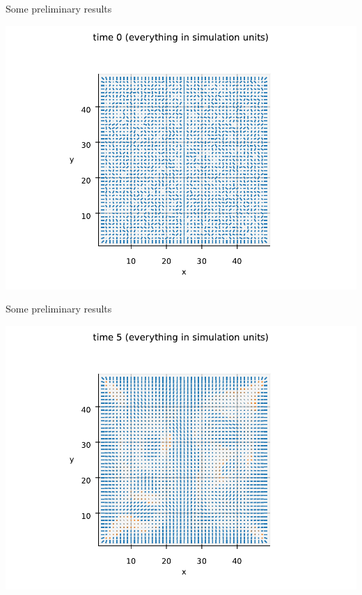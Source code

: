 \documentclass[10pt,notes]{beamer}
\begin{document}
\begin{frame}[fragile]{Some preliminary results}
    \newrefsection
    \begin{center}
        \includegraphics[width=\textwidth]{figures/prelim0.pdf}
    \end{center}
\end{frame}

\begin{frame}[fragile]{Some preliminary results}
    \newrefsection
    \begin{center}
        \includegraphics[width=\textwidth]{figures/prelim1.pdf}
    \end{center}
\end{frame}
\end{document}
